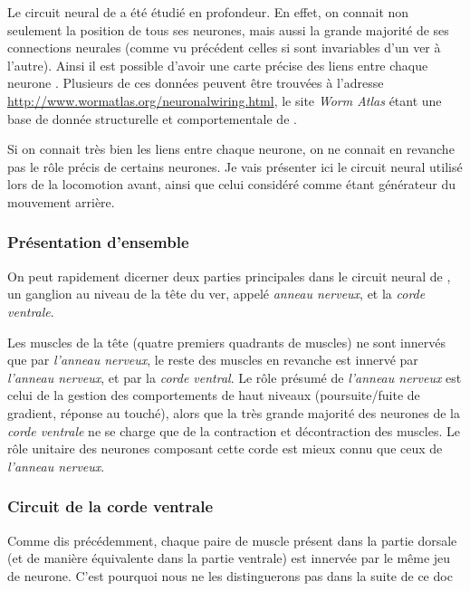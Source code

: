 Le circuit neural de \celeg{} a été étudié en profondeur. En effet, on connait
non seulement la position de tous ses neurones, mais aussi la grande majorité
de ses connections neurales (comme vu précédent celles si sont invariables d'un
ver à l'autre).  Ainsi il est possible d'avoir une carte précise des liens
entre chaque neurone \cite{Durbin1987,Chen2006,Boyle2009,Varshney2011}.
Plusieurs de ces données peuvent être trouvées à l'adresse
\url{http://www.wormatlas.org/neuronalwiring.html}, le site \textit{Worm Atlas}
étant une base de donnée structurelle et comportementale de \celeg{}.

Si on connait très bien les liens entre chaque neurone, on ne connait en
revanche pas le rôle précis de certains neurones. Je vais présenter ici le
circuit neural utilisé lors de la locomotion avant, ainsi que celui
considéré comme étant générateur du mouvement arrière.

\subsubsection{Présentation d'ensemble} %
\label{ssub:Présentation d'ensemble}

On peut rapidement dicerner deux parties principales dans le circuit neural de
\celeg{}, un ganglion au niveau de la tête du ver, appelé \textit{anneau
nerveux}, et la \textit{corde ventrale}.

Les muscles de la tête (quatre premiers quadrants de muscles) ne sont innervés que
par \textit{l'anneau nerveux}, le reste des muscles en revanche est innervé
par \textit{l'anneau nerveux}, et par la \textit{corde ventral}.  Le rôle
présumé de \textit{l'anneau nerveux} est celui de la gestion des comportements
de haut niveaux (poursuite/fuite de gradient, réponse au touché), alors que la
très grande majorité des neurones de la \textit{corde ventrale} ne se charge que
de la contraction et décontraction des muscles. Le rôle unitaire des neurones
composant cette corde est mieux connu que ceux de \textit{l'anneau nerveux}.


\subsubsection{Circuit de la corde ventrale} %
\label{ssub:Circuit de la corde ventrale}

Comme dis précédemment, chaque paire de muscle présent dans la partie dorsale
(et de manière équivalente dans la partie ventrale) est innervée par le même
jeu de neurone. C'est pourquoi nous ne les distinguerons pas dans la
suite de ce doc

